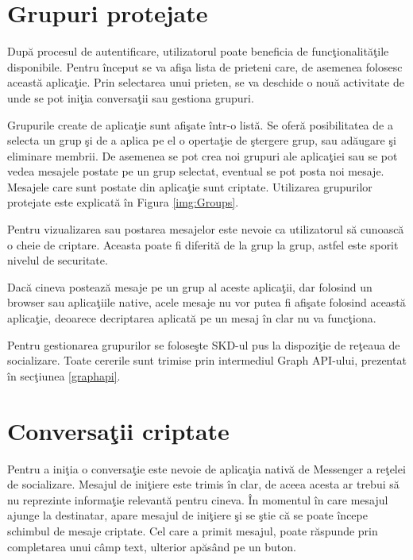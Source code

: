 \section{Grupuri protejate}

Dup\u{a} procesul de autentificare, utilizatorul poate beneficia de func\c{t}ionalit\u{a}\c{t}ile disponibile. Pentru \^{i}nceput se va afi\c{s}a lista de prieteni care, de asemenea folosesc aceast\u{a} aplica\c{t}ie. Prin selectarea unui prieten, se va deschide o nou\u{a} activitate de unde se pot ini\c{t}ia conversa\c{t}ii sau gestiona grupuri.

Grupurile create de aplica\c{t}ie sunt afi\c{s}ate \^{i}ntr-o list\u{a}. Se ofer\u{a} posibilitatea de a selecta un grup \c{s}i de a aplica pe el o operta\c{t}ie de \c{s}tergere grup, sau ad\u{a}ugare \c{s}i eliminare membrii. De asemenea se pot crea noi grupuri ale aplica\c{t}iei sau se pot vedea mesajele postate pe un grup selectat, eventual se pot posta noi mesaje. Mesajele care sunt postate din aplica\c{t}ie sunt criptate. Utilizarea grupurilor protejate este explicat\u{a} \^{i}n Figura \ref{img:Groups}.


Pentru vizualizarea sau postarea mesajelor este nevoie ca utilizatorul s\u{a} cunoasc\u{a} o cheie de criptare. Aceasta poate fi diferit\u{a} de la grup la grup, astfel este sporit nivelul de securitate.

Dac\u{a} cineva posteaz\u{a} mesaje pe un grup al aceste aplica\c{t}ii, dar folosind un browser sau aplica\c{t}iile native, acele mesaje nu vor putea fi afi\c{s}ate folosind aceast\u{a} aplica\c{t}ie, deoarece decriptarea aplicat\u{a} pe un mesaj \^{i}n clar nu va func\c{t}iona.

Pentru gestionarea grupurilor se folose\c{s}te SKD-ul pus la dispozi\c{t}ie de re\c{t}eaua de socializare. Toate cererile sunt trimise prin intermediul Graph API-ului, prezentat \^{i}n sec\c{t}iunea \ref{graphapi}.

\section{Conversa\c{t}ii criptate}

Pentru a ini\c{t}ia o conversa\c{t}ie este nevoie de aplica\c{t}ia nativ\u{a} de Messenger a re\c{t}elei de socializare. Mesajul de ini\c{t}iere este trimis \^{i}n clar, de aceea acesta ar trebui s\u{a} nu reprezinte informa\c{t}ie relevant\u{a} pentru cineva. \^{I}n momentul \^{i}n care mesajul ajunge la destinatar, apare mesajul de ini\c{t}iere \c{s}i se \c{s}tie c\u{a} se poate \^{i}ncepe schimbul de mesaje criptate. Cel care a primit mesajul, poate r\u{a}spunde prin completarea unui c\^{a}mp text, ulterior ap\u{a}s\^{a}nd pe un buton.

